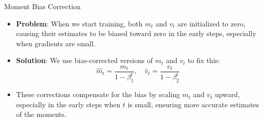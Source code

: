 \documentclass[serif, aspectratio=169]{beamer}
\begin{document}
\begin{frame}{Moment Bias Correction}
    \begin{itemize}
        \item \textbf{Problem}: When we start training, both $m_t$ and $v_t$ are initialized to zero, causing their estimates to be biased toward zero in the early steps, especially when gradients are small.
        \item \textbf{Solution}: We use bias-corrected versions of $m_t$ and $v_t$ to fix this:
        \[\hat{m}_t = \frac{m_t}{1 - \beta_1^t}, \quad 
        \hat{v}_t = \frac{v_t}{1 -\beta_2^t}\]
        \item These corrections compensate for the bias by scaling $m_t$ and $v_t$ upward, especially in the early steps when $t$ is small, ensuring more accurate estimates of the moments.
    \end{itemize}
\end{frame}



\end{document}
